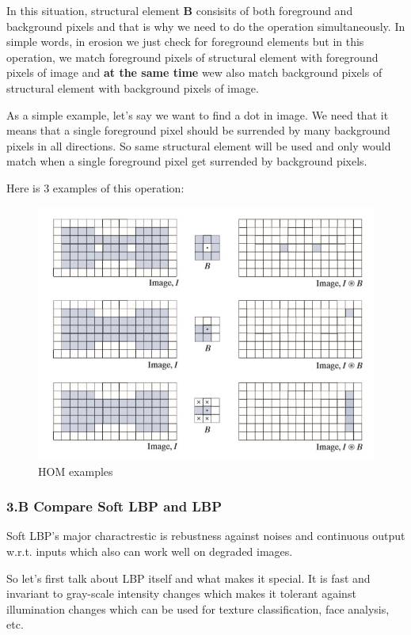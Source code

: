 \documentclass[11pt]{article}
\makeatletter
\def\maxwidth{\ifdim\Gin@nat@width>\linewidth\linewidth
    \else\Gin@nat@width\fi}
\let\Oldincludegraphics\includegraphics
\renewcommand{\includegraphics}[1]{\Oldincludegraphics[width=.8\maxwidth]{#1}}
\makeatother
\begin{document}
In this situation, structural element \textbf{B} consisits of both
foreground and background pixels and that is why we need to do the
operation simultaneously. In simple words, in erosion we just check for
foreground elements but in this operation, we match foreground pixels of
structural element with foreground pixels of image and \textbf{at the
same time} wew also match background pixels of structural element with
background pixels of image.

As a simple example, let's say we want to find a dot in image. We need
that it means that a single foreground pixel should be surrended by many
background pixels in all directions. So same structural element will be
used and only would match when a single foreground pixel get surrended
by background pixels.

Here is 3 examples of this operation:

\begin{figure}
\centering
\includegraphics{wiki/3_1_3.jpg}
\caption{HOM examples}
\end{figure}

    \hypertarget{b-compare-soft-lbp-and-lbp}{%
\subsubsection{3.B Compare Soft LBP and
LBP}\label{b-compare-soft-lbp-and-lbp}}

Soft LBP's major charactrestic is rebustness against noises and
continuous output w.r.t. inputs which also can work well on degraded
images.

So let's first talk about LBP itself and what makes it special. It is
fast and invariant to gray-scale intensity changes which makes it
tolerant against illumination changes which can be used for texture
classification, face analysis, etc.
\end{document}
